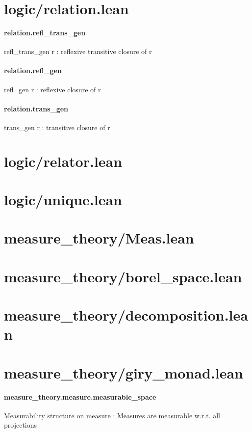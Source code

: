 \documentclass{article}
\begin{document}
\section{logic/relation.lean}\paragraph{relation.refl\_trans\_gen}
\par
\colorbox[RGB]{253,246,227}{{{{\color[RGB]{101, 123, 131} refl\_trans\_gen r }}}}: reflexive transitive closure of 
\colorbox[RGB]{253,246,227}{{{{\color[RGB]{101, 123, 131} r }}}}\paragraph{relation.refl\_gen}
\par
\colorbox[RGB]{253,246,227}{{{{\color[RGB]{101, 123, 131} refl\_gen r }}}}: reflexive closure of 
\colorbox[RGB]{253,246,227}{{{{\color[RGB]{101, 123, 131} r }}}}\paragraph{relation.trans\_gen}
\par
\colorbox[RGB]{253,246,227}{{{{\color[RGB]{101, 123, 131} trans\_gen r }}}}: transitive closure of 
\colorbox[RGB]{253,246,227}{{{{\color[RGB]{101, 123, 131} r }}}}\section{logic/relator.lean}\section{logic/unique.lean}\section{measure\_theory/Meas.lean}\section{measure\_theory/borel\_space.lean}\section{measure\_theory/decomposition.lean}\section{measure\_theory/giry\_monad.lean}\paragraph{measure\_theory.measure.measurable\_space}
\par
Measurability structure on 
\colorbox[RGB]{253,246,227}{{{{\color[RGB]{101, 123, 131} measure }}}}: Measures are measurable w.r.t. all projections
\end{document}
